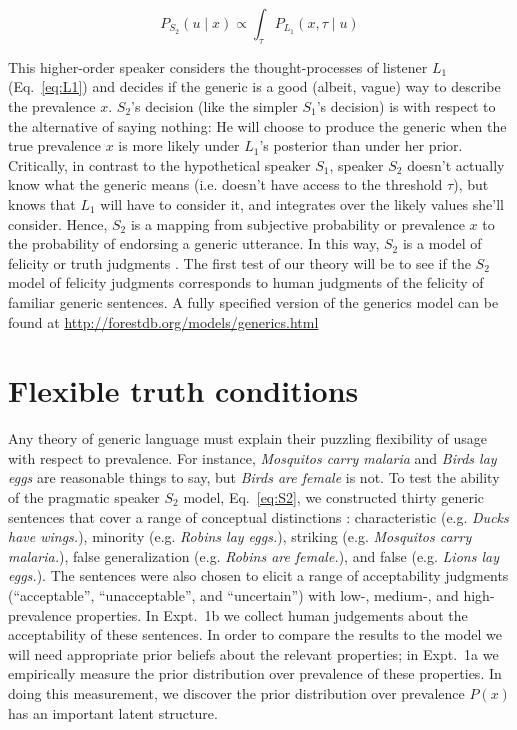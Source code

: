 \documentclass[12pt,letterpaper]{article}
\begin{document}
\begin{equation} 
P_{S_{2}}(u \mid x) \propto  \int_{\tau} P_{L_{1}}(x , \tau \mid u) %
\label{eq:S2}
\end{equation}

This higher-order speaker considers the thought-processes of listener $L_1$ (Eq.~\ref{eq:L1}) and decides if the generic is a good (albeit, vague) way to describe the  prevalence $x$. 
$S_2$'s decision (like the simpler $S_1$'s decision) is with respect to the alternative of saying nothing: He will choose to produce the generic when the true prevalence $x$ is more likely under $L_1$'s posterior than under her prior. 
Critically, in contrast to the hypothetical speaker $S_1$, speaker $S_{2}$ doesn't actually know what the generic means (i.e. doesn't have access to the threshold $\tau$), but knows that $L_{1}$ will have to consider it, and integrates over the likely values she'll consider.
Hence, $S_2$ is a mapping from subjective probability or prevalence $x$ to the probability of endorsing a generic utterance. 
In this way, $S_2$ is a model of felicity or truth judgments \cite{Degen2014}.
The first test of our theory will be to see if the $S_2$ model of felicity judgments corresponds to human judgments of the felicity of familiar generic sentences. 
A fully specified version of the generics model can be found at \url{http://forestdb.org/models/generics.html}

%

\section*{Flexible truth conditions}

Any theory of generic language must explain their puzzling flexibility of usage with respect to prevalence.
For instance, \emph{Mosquitos carry malaria} and \emph{Birds lay eggs} are reasonable things to say, but \emph{Birds are female} is not.
To test the ability of the pragmatic speaker $S_2$ model, Eq.~\ref{eq:S2}, we constructed thirty generic sentences 
that cover a range of conceptual distinctions  \cite{Prasada2013}: characteristic (e.g. \emph{Ducks have wings.}), minority (e.g. \emph{Robins lay eggs.}), striking (e.g. \emph{Mosquitos carry malaria.}), false generalization (e.g. \emph{Robins are female.}), and false (e.g. \emph{Lions lay eggs.}).
The sentences were also chosen to elicit a range of acceptability judgments (``acceptable'', ``unacceptable'', and ``uncertain'') with low-, medium-, and high-prevalence properties.
In Expt.~1b we collect human judgements about the acceptability of these sentences. 
In order to compare the results to the model we will need appropriate prior beliefs about the relevant properties; 
in Expt.~1a we empirically measure the prior distribution over prevalence of these properties.
In doing this measurement, we discover the prior distribution over prevalence $P(x)$ has an important latent structure.
\end{document}
